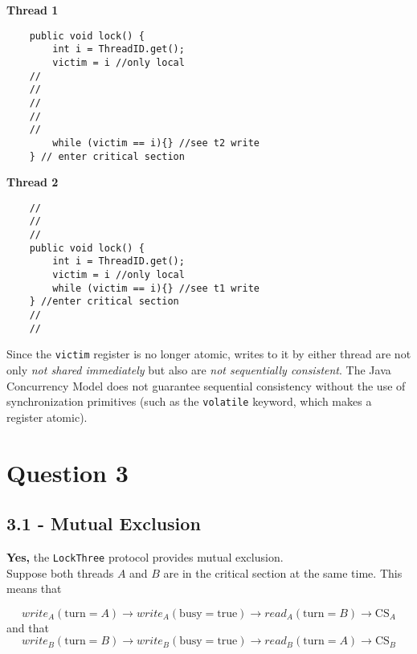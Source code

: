 \documentclass[11pt, letterpaper]{article}
\newcommand{\code}[1] { \texttt{#1} }
\begin{document}
\begin{figure*}[h!]
    \begin{minipage}{0.5\textwidth}
        \centering
        \textbf{Thread 1}
        \begin{verbatim}
    public void lock() {
        int i = ThreadID.get();
        victim = i //only local
    //
    //
    //
    //
    //
        while (victim == i){} //see t2 write
    } // enter critical section
        \end{verbatim}
    \end{minipage}
    \hspace{1cm}
    \begin{minipage}{0.5\textwidth}
        \centering
        \textbf{Thread 2}
        \begin{verbatim}
    //
    //
    //
    public void lock() {
        int i = ThreadID.get();
        victim = i //only local
        while (victim == i){} //see t1 write
    } //enter critical section
    //
    //
            \end{verbatim}
    \end{minipage}
\end{figure*}

Since the \code{victim} register is no longer atomic, writes to it by either thread are not only \textit{not shared immediately} but also are \textit{not sequentially consistent}. The Java Concurrency Model does not guarantee sequential consistency without the use of synchronization primitives (such as the \code{volatile} keyword, which makes a register atomic).

\newpage
\section*{Question 3}
\label{sec:question_3}

\subsection*{3.1 - Mutual Exclusion}
\label{sub:3_1_mutual_exclusion}

\textbf{Yes,} the \code{LockThree} protocol provides mutual exclusion.\\

Suppose both threads $A$ and $B$ are in the critical section at the same time. This means that

$$
write_A(\text{turn} = A) \rightarrow write_A(\text{busy} = \text{true}) \rightarrow
read_A(\text{turn} = B) \rightarrow \text{CS}_A
$$
and that
$$
write_B(\text{turn} = B) \rightarrow write_B(\text{busy} = \text{true}) \rightarrow
read_B(\text{turn} = A) \rightarrow \text{CS}_B
$$
\end{document}
